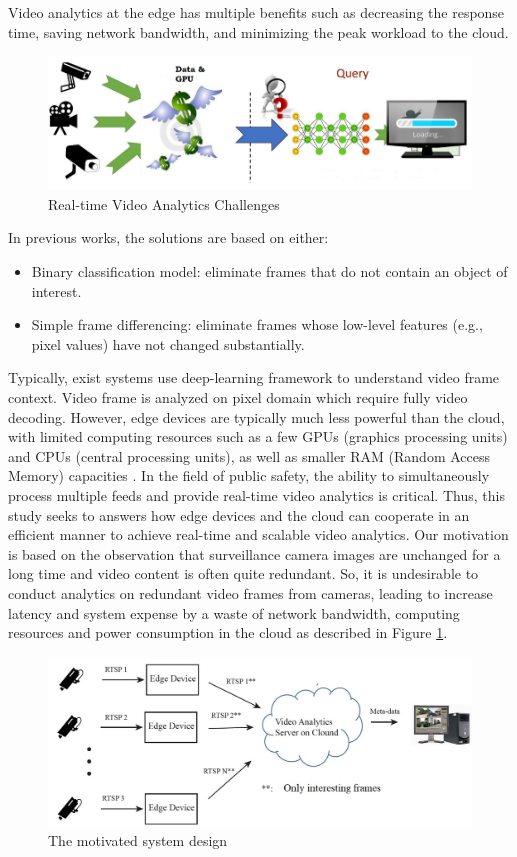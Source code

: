 Video analytics at the edge has multiple benefits such as decreasing the response time, saving network bandwidth, and minimizing the peak workload to the cloud. 
\begin{figure}
\centering
 \includegraphics[width=1.0\linewidth]{Figures/vachallenge.png}
 \caption{Real-time Video Analytics Challenges}
 \label{fig:chal}
\end{figure}
In previous works, the solutions are based on either:
\begin{itemize}
\item Binary classification model: eliminate frames that do not contain an object of interest.
\item Simple frame differencing: eliminate frames whose low-level
features (e.g., pixel values) have not changed substantially.
\end{itemize}
Typically, exist systems use deep-learning framework to understand video frame context. Video frame is analyzed on pixel domain which require fully video decoding. However, edge devices are typically much less powerful than the cloud, with limited computing resources such as a few GPUs (graphics processing units) and CPUs (central processing units), as well as smaller RAM (Random Access Memory) capacities \cite{stone2019towards}. In the field of public safety, the ability to simultaneously process multiple feeds and provide real-time video analytics is critical. Thus, this study seeks to answers how edge devices and the cloud can cooperate in an efficient manner to achieve real-time and scalable video analytics. Our motivation is based on the observation that surveillance camera images are unchanged for a long time and video content is often quite redundant. So, it is undesirable to conduct analytics on redundant video frames from cameras, leading to increase latency and system expense by a waste of network bandwidth, computing resources and power consumption in the cloud as described in Figure \ref{fig:chal}. \\
\begin{figure}
\centering
 \includegraphics[width=1.0\linewidth]{Figures/motivation.jpg}
 \caption{The motivated system design}
 \label{fig:mot}
\end{figure}
